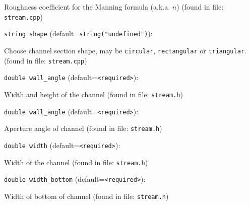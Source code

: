 Roughness coefficient for the Manning formula (a.k.a. $n$)
 (found in file: \verb+stream.cpp+)
\item\verb+string shape+ {\rm(default=\verb|string("undefined")|)}:

Choose channel section shape, may be {\tt circular},
 {\tt rectangular} or {\tt triangular}.
 (found in file: \verb+stream.cpp+)
\item\verb+double wall_angle+ {\rm(default=\verb|<required>|)}:

Width and height of the channel
 (found in file: \verb+stream.h+)
\item\verb+double wall_angle+ {\rm(default=\verb|<required>|)}:

Aperture angle of channel
 (found in file: \verb+stream.h+)
\item\verb+double width+ {\rm(default=\verb|<required>|)}:

Width of the channel
 (found in file: \verb+stream.h+)
\item\verb+double width_bottom+ {\rm(default=\verb|<required>|)}:

Width of bottom of channel
 (found in file: \verb+stream.h+)
